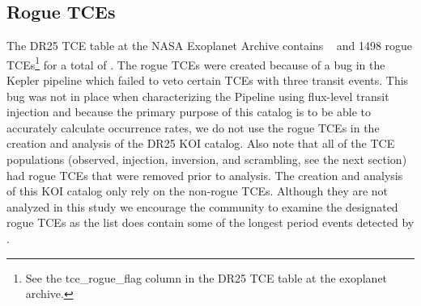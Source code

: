 \subsection{Rogue TCEs}
The DR25 TCE table at the NASA Exoplanet Archive contains \ntcesnorogue\  and 1498 rogue TCEs\footnote{See the tce\_rogue\_flag column in the DR25 TCE table at the exoplanet archive.} for a total of \ntces. The rogue TCEs were created because of a bug in the Kepler pipeline which failed to veto certain TCEs with three transit events.  This bug was not in place when characterizing the Pipeline using flux-level transit injection \citep[see][]{Burke2017a,Burke2017b} and because the primary purpose of this catalog is to be able to accurately calculate occurrence rates, we do not use the rogue TCEs in the creation and analysis of the DR25 KOI catalog. Also note that all of the TCE populations (observed, injection, inversion, and scrambling, see the next section) had rogue TCEs that were removed prior to analysis. The creation and analysis of this KOI catalog only rely on the non-rogue TCEs. Although they are not analyzed in this study we encourage the community to examine the designated rogue TCEs as the list does contain some of the longest period events detected by \Kepler.


